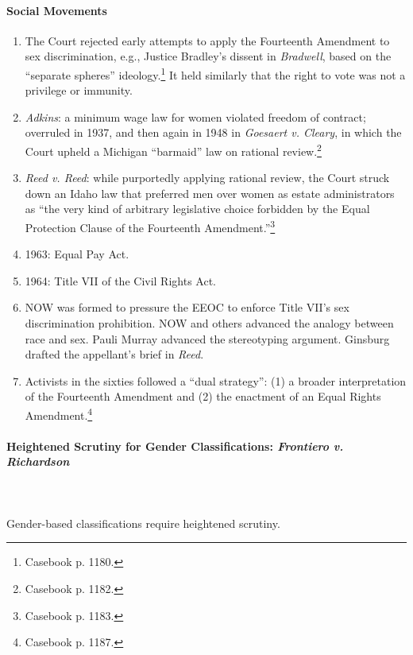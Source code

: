 \paragraph{Social Movements}

\begin{enumerate}
    \item The Court rejected early attempts to apply the Fourteenth Amendment 
    to sex discrimination, e.g., Justice Bradley's dissent in \emph{Bradwell}, 
    based on the ``separate spheres'' ideology.\footnote{Casebook p. 1180.} It 
    held similarly that the right to vote was not a privilege or immunity.
    \item \emph{Adkins}: a minimum wage law for women violated freedom of 
    contract; overruled in 1937, and then again in 1948 in \emph{Goesaert v. 
    Cleary}, in which the Court upheld a Michigan ``barmaid'' law on rational 
    review.\footnote{Casebook p. 1182.}
    \item \emph{Reed v. Reed}: while purportedly applying rational review, the 
    Court struck down an Idaho law that preferred men over women as estate 
    administrators as ``the very kind of arbitrary legislative choice 
    forbidden by the Equal Protection Clause of the Fourteenth 
    Amendment.''\footnote{Casebook p. 1183.}
    \item 1963: Equal Pay Act.
    \item 1964: Title VII of the Civil Rights Act.
    \item NOW was formed to pressure the EEOC to enforce Title VII's sex 
    discrimination prohibition. NOW and others advanced the analogy between 
    race and sex. Pauli Murray advanced the stereotyping argument. Ginsburg 
    drafted the appellant's brief in \emph{Reed}.
    \item Activists in the sixties followed a ``dual strategy'': (1) a broader 
    interpretation of the Fourteenth Amendment and (2) the enactment of an 
    Equal Rights Amendment.\footnote{Casebook p. 1187.}
\end{enumerate}

\paragraph{Heightened Scrutiny for Gender Classifications: \emph{Frontiero v. 
Richardson}}
~\\\\
Gender-based classifications require heightened scrutiny.

